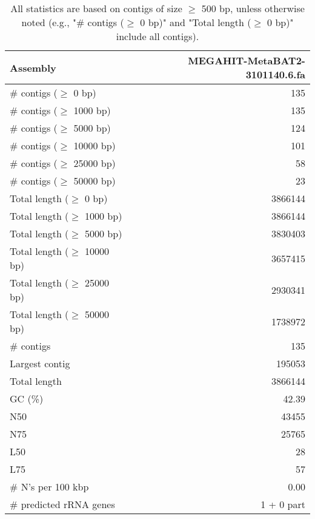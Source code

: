 \documentclass[12pt,a4paper]{article}
\begin{document}
\begin{table}[ht]
\begin{center}
\caption{All statistics are based on contigs of size $\geq$ 500 bp, unless otherwise noted (e.g., "\# contigs ($\geq$ 0 bp)" and "Total length ($\geq$ 0 bp)" include all contigs).}
\begin{tabular}{|l*{1}{|r}|}
\hline
Assembly & MEGAHIT-MetaBAT2-3101140.6.fa \\ \hline
\# contigs ($\geq$ 0 bp) & 135 \\ \hline
\# contigs ($\geq$ 1000 bp) & 135 \\ \hline
\# contigs ($\geq$ 5000 bp) & 124 \\ \hline
\# contigs ($\geq$ 10000 bp) & 101 \\ \hline
\# contigs ($\geq$ 25000 bp) & 58 \\ \hline
\# contigs ($\geq$ 50000 bp) & 23 \\ \hline
Total length ($\geq$ 0 bp) & 3866144 \\ \hline
Total length ($\geq$ 1000 bp) & 3866144 \\ \hline
Total length ($\geq$ 5000 bp) & 3830403 \\ \hline
Total length ($\geq$ 10000 bp) & 3657415 \\ \hline
Total length ($\geq$ 25000 bp) & 2930341 \\ \hline
Total length ($\geq$ 50000 bp) & 1738972 \\ \hline
\# contigs & 135 \\ \hline
Largest contig & 195053 \\ \hline
Total length & 3866144 \\ \hline
GC (\%) & 42.39 \\ \hline
N50 & 43455 \\ \hline
N75 & 25765 \\ \hline
L50 & 28 \\ \hline
L75 & 57 \\ \hline
\# N's per 100 kbp & 0.00 \\ \hline
\# predicted rRNA genes & 1 + 0 part \\ \hline
\end{tabular}
\end{center}
\end{table}
\end{document}
